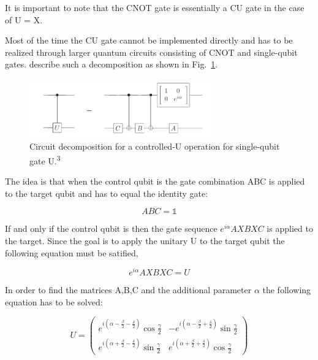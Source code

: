 It is important to note that the CNOT gate is essentially a CU gate in the case of U = X. 

Most of the time the CU gate cannot be implemented directly and has to be realized through larger quantum circuits consisting of CNOT and single-qubit gates.  describe such a decomposition as shown in Fig.~\ref{img:cudecomposition}.

\begin{figure}[ht]
   \centering
   \includegraphics[width=0.7\textwidth]{img/controlledudecomp.png}
   \caption{Circuit decomposition for a controlled-U operation for single-qubit gate U.\textsuperscript{3}}
   \label{img:cudecomposition}
\end{figure}


The idea is that when the control qubit is \0 the gate combination ABC is applied to the target qubit and has to equal the identity gate:

\begin{equation}
ABC = \mathbb{1}
\end{equation}

If and only if the control qubit is \1 then the gate sequence $e^{i\alpha}AXBXC$ is applied to the target. Since the goal is to apply the unitary U to the target qubit the following equation must be satified,

\begin{equation}
e^{i\alpha}AXBXC = U
\end{equation}

In order to find the matrices A,B,C and the additional parameter $\alpha$ the following equation has to be solved:

\begin{equation}
U = \begin{pmatrix}
 e^{i(\alpha-\frac{\beta}{2}-\frac{\delta}{2})}\cos{\frac{\gamma}{2}} & -e^{i(\alpha-\frac{\beta}{2}+\frac{\delta}{2})}\sin{\frac{\gamma}{2}} \\ 
e^{i(\alpha+\frac{\beta}{2}-\frac{\delta}{2})}\sin{\frac{\gamma}{2}} & e^{i(\alpha+\frac{\beta}{2}+\frac{\delta}{2})}\cos{\frac{\gamma}{2}}
 \end{pmatrix}
\end{equation}